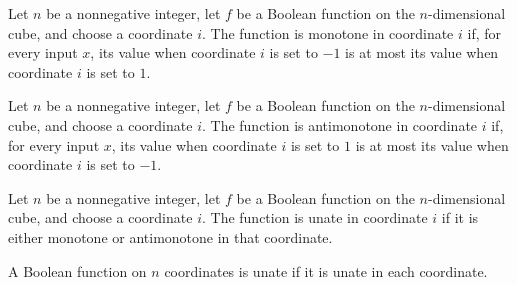 \begin{definition}
\label{FABL.IsMonotoneInCoordinate}
\leanok
{}
Let $n$ be a nonnegative integer, let $f$ be a Boolean function on the $n$-dimensional
cube, and choose a coordinate $i$. The function is monotone in coordinate $i$ if, for
every input $x$, its value when coordinate $i$ is set to $-1$ is at most its value when
coordinate $i$ is set to $1$.
\end{definition}

\begin{definition}
\label{FABL.IsAntimonotoneInCoordinate}
\leanok
{}
Let $n$ be a nonnegative integer, let $f$ be a Boolean function on the $n$-dimensional
cube, and choose a coordinate $i$. The function is antimonotone in coordinate $i$ if,
for every input $x$, its value when coordinate $i$ is set to $1$ is at most its value
when coordinate $i$ is set to $-1$.
\end{definition}

\begin{definition}
\label{FABL.IsUnateInCoordinate}
\leanok
{}
Let $n$ be a nonnegative integer, let $f$ be a Boolean function on the $n$-dimensional
cube, and choose a coordinate $i$. The function is unate in coordinate $i$ if it is
either monotone or antimonotone in that coordinate.
\end{definition}

\begin{definition}
\label{FABL.IsUnate}
\leanok
{}
A Boolean function on $n$ coordinates is unate if it is unate in each coordinate.
\end{definition}

